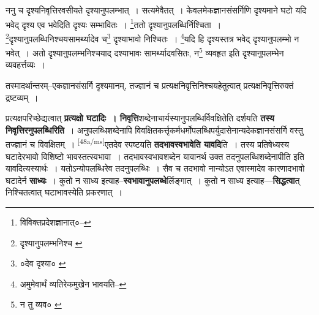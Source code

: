 \documentclass[article,12pt,a4paper]{memoir}
\begin{document}
	  \pstart ननु च दृश्यनिवृत्तिरवसीयते दृश्यानुपलम्भात् । सत्यमेवैतत् । केवलमेकज्ञानसंसर्गिणि दृश्यमाने घटो यदि भवेद् दृश्य एव भवेदिति दृश्यः सम्भावितः । \footnote{विविक्तप्रदेशज्ञानात्०--\cite{dp-msD-n}}ततो दृश्यानुपलब्धिर्निश्चिता । \footnote{दृश्यानुपलम्भनिश्च \cite{dp-msC} \cite{dp-msD}}दृश्यानुपलब्धिनिश्चयसामर्थ्यादेव च\footnote{०देव दृश्या० \cite{dp-edE}} दृश्याभावो निश्चितः । \footnote{अमुमेवार्थं व्यतिरेकमुखेन भावयति--\cite{dp-msD-n}}यदि हि दृश्यस्तत्र भवेद् दृश्यानुपलम्भो न भवेत् । अतो दृश्यानुपलम्भनिश्चयाद् दश्याभावः सामर्थ्यादवसितः, न\footnote{न तु व्यव० \cite{dp-msA} \cite{dp-edP} \cite{dp-edH} \cite{dp-edE} \cite{dp-edN}} व्यवहृत इति दृश्यानुपलम्भेन व्यवहर्त्तव्यः ।
	\pend
       

	  \pstart तस्मादर्थान्तरम्--एकज्ञानसंसर्गि दृश्यमानम्, तज्ज्ञानं च प्रत्यक्षनिवृत्तिनिश्चयहेतुत्वात् प्रत्यक्षनिवृत्तिरुक्तं द्रष्टव्यम् ।
	\pend
      

	  \pstart प्रत्यक्षपरिच्छेद्यत्वात् \textbf{प्रत्यक्षो घटादिः । निवृत्ति}शब्देनाचार्यस्यानुपलब्धिर्विवक्षितेति दर्शयति \textbf{तस्य निवृत्तिरनुपलब्धिरिति} । अनुपलब्धिशब्देनापि विवक्षितकर्त्तृकर्मधर्मोपलब्धिपर्युदासेनान्यदेकज्ञानसंसर्गि वस्तु तज्ज्ञानं च विवक्षितम् । \leavevmode\textsuperscript{\rmlatinfont\tiny [48a/ms]}एतदेव स्पष्टयति \textbf{तदभावस्वभावेति यावदि}ति । तस्य प्रतिषेध्यस्य घटादेरभावो विशिष्टो भावस्तत्स्वभावा । तदभावस्वभावशब्देन यावानर्थ उक्त तदनुपलब्धिशब्देनापीति इति यावदित्यस्यार्थः । यतोऽन्योपलब्धिरेव तदनुपलब्धिः । सैव च तदभावो नान्योऽत एवास्मादेव कारणादभावो घटादेर्न \textbf{साध्यः} । कुतो न साध्य इत्याह--\textbf{स्वभावानुपलब्धे}र्लिङ्गात् । कुतो न साध्य इत्याह—\textbf{सिद्धत्वा}त् निश्चितत्वात् घटाभावस्येति प्रकरणात् ।
	\pend
      
\end{document}
